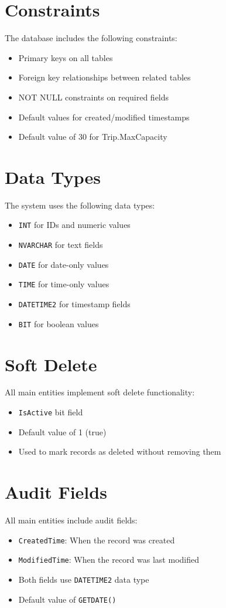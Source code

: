 \section{Constraints}
The database includes the following constraints:

\begin{itemize}
    \item Primary keys on all tables
    \item Foreign key relationships between related tables
    \item NOT NULL constraints on required fields
    \item Default values for created/modified timestamps
    \item Default value of 30 for Trip.MaxCapacity
\end{itemize}

\section{Data Types}
The system uses the following data types:

\begin{itemize}
    \item \texttt{INT} for IDs and numeric values
    \item \texttt{NVARCHAR} for text fields
    \item \texttt{DATE} for date-only values
    \item \texttt{TIME} for time-only values
    \item \texttt{DATETIME2} for timestamp fields
    \item \texttt{BIT} for boolean values
\end{itemize}

\section{Soft Delete}
All main entities implement soft delete functionality:

\begin{itemize}
    \item \texttt{IsActive} bit field
    \item Default value of 1 (true)
    \item Used to mark records as deleted without removing them
\end{itemize}

\section{Audit Fields}
All main entities include audit fields:

\begin{itemize}
    \item \texttt{CreatedTime}: When the record was created
    \item \texttt{ModifiedTime}: When the record was last modified
    \item Both fields use \texttt{DATETIME2} data type
    \item Default value of \texttt{GETDATE()}
\end{itemize} 